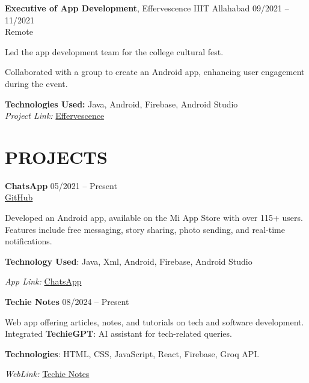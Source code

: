 \documentclass[10pt, letterpaper]{article}
\begin{document}
\vspace{1em}

\textbf{Executive of App Development},  Effervescence IIIT Allahabad \hfill 09/2021 -- 11/2021 \\
Remote
\begin{highlightsforbulletentries}
    \item Led the app development team for the college cultural fest.
    \item Collaborated with a group to create an Android app, enhancing user engagement during the event.
\end{highlightsforbulletentries}
\item
\textbf{Technologies Used:} Java, Android, Firebase, Android Studio \\
\textit{Project Link:} \href{https://github.com/jnvshubham7/Effervescence_21_CA}{Effervescence}


\section{PROJECTS}

\textbf{ChatsApp} \hfill 05/2021 -- Present \\
\href{https://github.com/jnvshubham7/ChatsApp}{GitHub} \\
\begin{highlightsforbulletentries}
    Developed an Android app, available on the Mi App Store with over 115+ users. Features include free messaging, story sharing, photo sending, and real-time notifications.
    \item \textbf{Technology Used}: Java, Xml, Android, Firebase, Android Studio
    \item \textit{App Link:} \href{https://global.app.mi.com/details?lo=IN&la=en_US&id=com.example.chatsapp}{ChatsApp}
\end{highlightsforbulletentries}

\vspace{2em}

\textbf{Techie Notes} \hfill 08/2024 -- Present 

\begin{highlightsforbulletentries}
     Web app offering articles, notes, and tutorials on tech and software development.
     Integrated \textbf{TechieGPT}: AI assistant for tech-related queries.
    \item \textbf{Technologies}: HTML, CSS, JavaScript, React, Firebase, Groq API.
    \item \textit{WebLink:} \href{https://techienotes.vercel.app}{Techie Notes}
\end{highlightsforbulletentries}
\end{document}
